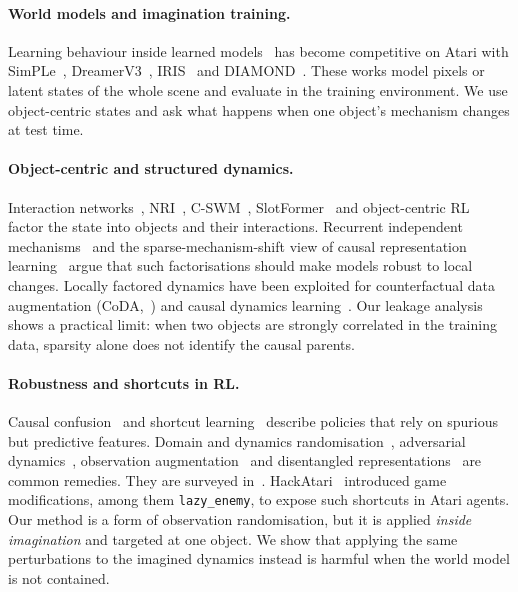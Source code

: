 \documentclass{article}
\newcommand{\lazy}{\texttt{lazy\_enemy}}
\begin{document}
\paragraph{World models and imagination training.} Learning behaviour inside learned
models~\cite{ha2018world} has become competitive on Atari with
SimPLe~\cite{kaiser2020simple}, DreamerV3~\cite{hafner2023dreamerv3}, IRIS~\cite{micheli2023iris} and
DIAMOND~\cite{alonso2024diamond}. These works model pixels or latent states of the whole scene and
evaluate in the training environment. We use object-centric states and ask what happens when one
object's mechanism changes at test time.

\paragraph{Object-centric and structured dynamics.} Interaction networks~\cite{battaglia2016interaction},
NRI~\cite{kipf2018nri}, C-SWM~\cite{kipf2020cswm}, SlotFormer~\cite{wu2023slotformer} and object-centric
RL~\cite{zadaianchuk2023sgoal,delfosse2024interpretable} factor the state into objects and their
interactions. Recurrent independent mechanisms~\cite{goyal2021rims} and the sparse-mechanism-shift
view of causal representation learning~\cite{scholkopf2021causal} argue that such factorisations
should make models robust to local changes. Locally factored dynamics have been exploited for
counterfactual data augmentation (CoDA,~\cite{pitis2020coda}) and causal dynamics
learning~\cite{wang2022cdl}. Our leakage analysis shows a practical limit: when two objects are
strongly correlated in the training data, sparsity alone does not identify the causal parents.

\paragraph{Robustness and shortcuts in RL.} Causal confusion~\cite{dehaan2019causal} and shortcut
learning~\cite{geirhos2020shortcut} describe policies that rely on spurious but predictive features.
Domain and dynamics randomisation~\cite{tobin2017domain,peng2018sim2real}, adversarial
dynamics~\cite{pinto2017rarl}, observation augmentation~\cite{laskin2020rad,lee2021learning} and
disentangled representations~\cite{dunion2023conditional} are common remedies. They are surveyed
in~\cite{kirk2023survey}. HackAtari~\cite{delfosse2024hackatari} introduced game modifications, among
them \lazy{}, to expose such shortcuts in Atari agents. Our method is a form of observation
randomisation, but it is applied \emph{inside imagination} and targeted at one object. We show that
applying the same perturbations to the imagined dynamics instead is harmful when the world model is
not contained.
\end{document}
